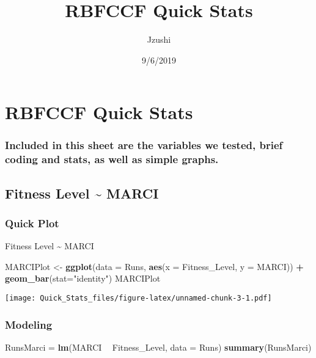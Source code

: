 \documentclass[]{article}
\title{RBFCCF Quick Stats}
\author{Jzushi}
\date{9/6/2019}
\newenvironment{Shaded}{\begin{snugshade}}{\end{snugshade}}
\newcommand{\KeywordTok}[1]{\textcolor[rgb]{0.13,0.29,0.53}{\textbf{#1}}}
\newcommand{\DataTypeTok}[1]{\textcolor[rgb]{0.13,0.29,0.53}{#1}}
\newcommand{\StringTok}[1]{\textcolor[rgb]{0.31,0.60,0.02}{#1}}
\newcommand{\OperatorTok}[1]{\textcolor[rgb]{0.81,0.36,0.00}{\textbf{#1}}}
\newcommand{\NormalTok}[1]{#1}
\begin{document}
\maketitle

\section{RBFCCF Quick Stats}\label{rbfccf-quick-stats}

\subsubsection{Included in this sheet are the variables we tested, brief
coding and stats, as well as simple
graphs.}\label{included-in-this-sheet-are-the-variables-we-tested-brief-coding-and-stats-as-well-as-simple-graphs.}

\subsection{Fitness Level \textasciitilde{}
MARCI}\label{fitness-level-marci}

\subsubsection{Quick Plot}\label{quick-plot}

Fitness Level \textasciitilde{} MARCI

\begin{Shaded}
\begin{Highlighting}[]
\NormalTok{MARCIPlot <-}\StringTok{ }\KeywordTok{ggplot}\NormalTok{(}\DataTypeTok{data =}\NormalTok{ Runs, }\KeywordTok{aes}\NormalTok{(}\DataTypeTok{x =}\NormalTok{ Fitness_Level, }\DataTypeTok{y =}\NormalTok{ MARCI)) }\OperatorTok{+}
\StringTok{  }\KeywordTok{geom_bar}\NormalTok{(}\DataTypeTok{stat=}\StringTok{"identity"}\NormalTok{)}
\NormalTok{MARCIPlot}
\end{Highlighting}
\end{Shaded}

\texttt{[image: Quick\_Stats\_files/figure-latex/unnamed-chunk-3-1.pdf]}

\subsubsection{Modeling}\label{modeling}

\begin{Shaded}
\begin{Highlighting}[]
\NormalTok{RunsMarci =}\StringTok{ }\KeywordTok{lm}\NormalTok{(MARCI }\OperatorTok{~}\StringTok{ }\NormalTok{Fitness_Level, }\DataTypeTok{data =}\NormalTok{ Runs)}
\KeywordTok{summary}\NormalTok{(RunsMarci)}
\end{Highlighting}
\end{Shaded}
\end{document}
